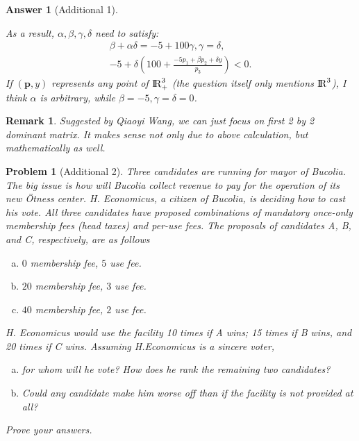 \documentclass{article}
\newtheorem*{ans}{Answer}
\newtheorem*{prob}{{\bf Problem}}
\newtheorem{rem}{\bf Remark}
\newcommand {\Reals}  {{\rm I \! R}}
\newcommand{\1}{{\bf 1}}
\newcommand{\0}{{\mathbf{0}}}
\newcommand{\p}{{\mathbf{p}}}
\newcommand{\<}{\langle}
\renewcommand{\>}{\rangle}
\begin{document}
\begin{ans}[Additional 1]
\begin{enumerate}[(a)]
As a result, $\alpha,\beta,\gamma,\delta$ need to satisfy:
\begin{eqnarray*}
\beta+ \alpha \delta = -5 + 100 \gamma, \gamma = \delta,
	\\
 -5 + \delta \left(100 + \frac{-5 p_1 + \beta p_2 + \delta y}{p_3} \right) <0.
\end{eqnarray*}
If $(\p,y)$ represents any point of $\Reals_+^3$ (the question itself only mentions $\Reals^3$), I think $\alpha$ is arbitrary, while $\beta = -5, \gamma =  \delta = 0$.
	\end{enumerate}
\end{ans}



\begin{rem}
	Suggested by Qiaoyi Wang, we can just focus on first 2 by 2 dominant matrix. It makes sense not only due to above calculation, but mathematically as well.
\end{rem}
\begin{prob}[Additional 2]
	Three candidates are running for mayor of Bucolia. The big issue is how will Bucolia collect revenue to pay for the operation of its new Ötness center. H. Economicus, a citizen of Bucolia, is deciding how to cast his vote. All three candidates have proposed combinations of mandatory once-only membership fees (head taxes) and per-use fees. The proposals of candidates A, B, and C, respectively, are as follows
	\begin{enumerate}[(a)] 
	\item $0$ membership fee,  $5$  use fee.
	\item  $20$ membership fee, $3$ use fee. 
	\item  $40 $ membership fee, $2$ use fee.
\end{enumerate}
H. Economicus would use the facility 10 times if A wins; 15 times if B wins, and 20 times if C wins. Assuming H.Economicus is a sincere voter,
\begin{enumerate}[(a)]
	\item  for whom will he vote?  How does he rank the remaining two candidates? 
\item 	Could any candidate make him worse off than if the facility is not provided at all? 
\end{enumerate}
Prove your answers.
\end{prob}
\end{document}
